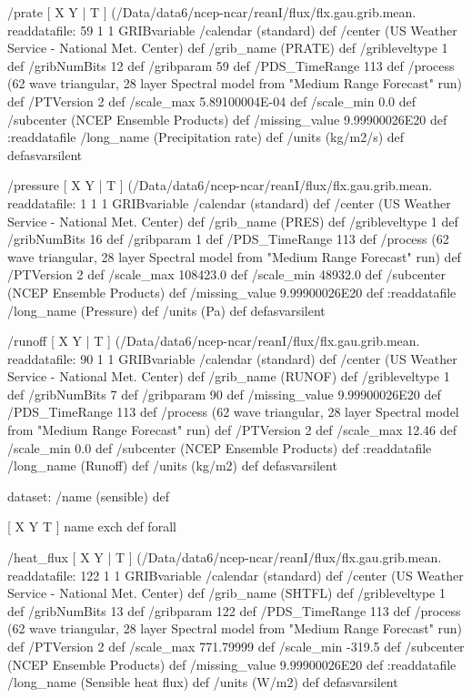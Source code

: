 \begin{ingrid}

  /prate { [ X Y | T ] (/Data/data6/ncep-ncar/reanI/flux/flx.gau.grib.mean.%
  readdatafile:
  59 1 1 GRIBvariable
  /calendar (standard) def
  /center (US Weather Service - National Met. Center) def
  /grib_name (PRATE) def
  /gribleveltype 1 def
  /gribNumBits 12 def
  /gribparam 59 def
  /PDS_TimeRange 113 def
  /process (62 wave triangular, 28 layer Spectral model from "Medium Range Forecast" run) def
  /PTVersion 2 def
  /scale_max 5.89100004E-04 def
  /scale_min 0.0 def
  /subcenter (NCEP Ensemble Products) def
  /missing_value 9.99900026E20 def
  :readdatafile
  /long_name (Precipitation rate) def
  /units (kg/m2/s) def
  } defasvarsilent

  /pressure { [ X Y | T ] (/Data/data6/ncep-ncar/reanI/flux/flx.gau.grib.mean.%
  readdatafile:
  1 1 1 GRIBvariable
  /calendar (standard) def
  /center (US Weather Service - National Met. Center) def
  /grib_name (PRES) def
  /gribleveltype 1 def
  /gribNumBits 16 def
  /gribparam 1 def
  /PDS_TimeRange 113 def
  /process (62 wave triangular, 28 layer Spectral model from "Medium Range Forecast" run) def
  /PTVersion 2 def
  /scale_max 108423.0 def
  /scale_min 48932.0 def
  /subcenter (NCEP Ensemble Products) def
  /missing_value 9.99900026E20 def
  :readdatafile
  /long_name (Pressure) def
  /units (Pa) def
  } defasvarsilent

  /runoff { [ X Y | T ] (/Data/data6/ncep-ncar/reanI/flux/flx.gau.grib.mean.%
  readdatafile:
  90 1 1 GRIBvariable
  /calendar (standard) def
  /center (US Weather Service - National Met. Center) def
  /grib_name (RUNOF) def
  /gribleveltype 1 def
  /gribNumBits 7 def
  /gribparam 90 def
  /missing_value 9.99900026E20 def
  /PDS_TimeRange 113 def
  /process (62 wave triangular, 28 layer Spectral model from "Medium Range Forecast" run) def
  /PTVersion 2 def
  /scale_max 12.46 def
  /scale_min 0.0 def
  /subcenter (NCEP Ensemble Products) def
  :readdatafile
  /long_name (Runoff) def
  /units (kg/m2) def
  } defasvarsilent

  dataset: /name (sensible) def

   [ X Y T ] { name exch def } forall

   /heat_flux { [ X Y | T ] (/Data/data6/ncep-ncar/reanI/flux/flx.gau.grib.mean.%
   readdatafile:
   122 1 1 GRIBvariable
   /calendar (standard) def
   /center (US Weather Service - National Met. Center) def
   /grib_name (SHTFL) def
   /gribleveltype 1 def
   /gribNumBits 13 def
   /gribparam 122 def
   /PDS_TimeRange 113 def
   /process (62 wave triangular, 28 layer Spectral model from "Medium Range Forecast" run) def
   /PTVersion 2 def
   /scale_max 771.79999 def
   /scale_min -319.5 def
   /subcenter (NCEP Ensemble Products) def
   /missing_value 9.99900026E20 def
   :readdatafile
   /long_name (Sensible heat flux) def
   /units (W/m2) def
   } defasvarsilent


\end{ingrid}
